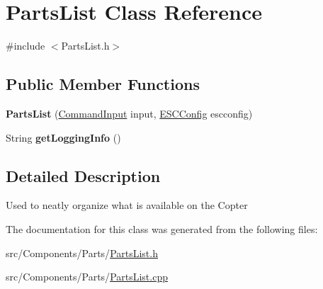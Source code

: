 \hypertarget{classPartsList}{}\section{Parts\+List Class Reference}
\label{classPartsList}


{\ttfamily \#include $<$Parts\+List.\+h$>$}

\subsection*{Public Member Functions}
\begin{DoxyCompactItemize}
\item 
\hypertarget{classPartsList_a3dd26f3482e9da9d5ba6e457e8a76c21}{}{\bfseries Parts\+List} (\hyperlink{classCommandInput}{Command\+Input} input, \hyperlink{classESCConfig}{E\+S\+C\+Config} escconfig)\label{classPartsList_a3dd26f3482e9da9d5ba6e457e8a76c21}

\item 
\hypertarget{classPartsList_a91e239443c4cbf7661bc620715d759df}{}String {\bfseries get\+Logging\+Info} ()\label{classPartsList_a91e239443c4cbf7661bc620715d759df}

\end{DoxyCompactItemize}


\subsection{Detailed Description}
Used to neatly organize what is available on the Copter 

The documentation for this class was generated from the following files\+:\begin{DoxyCompactItemize}
\item 
src/\+Components/\+Parts/\hyperlink{PartsList_8h}{Parts\+List.\+h}\item 
src/\+Components/\+Parts/\hyperlink{PartsList_8cpp}{Parts\+List.\+cpp}\end{DoxyCompactItemize}
